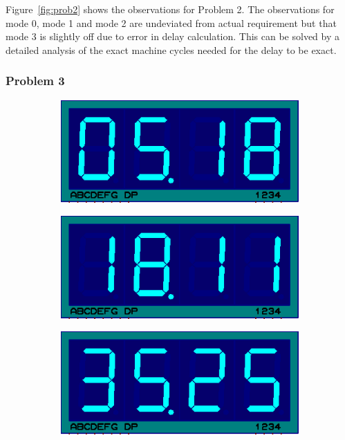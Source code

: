 \documentclass{lab_sheet}
\begin{document}
    Figure~\ref{fig:prob2} shows the observations for Problem 2. The observations for mode 0, mode 1 and mode 2 are undeviated from actual requirement but that mode 3 is slightly off due to error in delay calculation. This can be solved by a detailed analysis of the exact machine cycles needed for the delay to be exact.
    \subsubsection*{Problem 3}
    \begin{figure}[H]
        \begin{subfigure}{.5\textwidth}
        \centering
        \includegraphics[width=.8\linewidth,frame]{../Figures/3a}
        \caption{}
        \label{fig:prob3_a}
        \end{subfigure}
        \begin{subfigure}{.5\textwidth}
            \centering
            \includegraphics[width=.8\linewidth,frame]{../Figures/3c}
            \caption{}
            \label{fig:prob3_b}
            \end{subfigure}
            \newline
            \begin{subfigure}{.5\textwidth}
                \centering
                \includegraphics[width=.8\linewidth,frame]{../Figures/3b}

\end{subfigure}
\end{figure}
\end{document}
